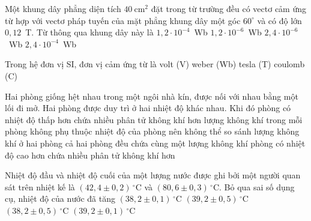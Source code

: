 	\begin{ex}%
		Một khung dây phẳng diện tích $40~\text{cm}^2$ đặt trong từ trường đều có vectơ cảm ứng từ hợp với vectơ pháp tuyến của mặt phẳng khung dây một góc $60^\circ$ và có độ lớn $0{,}12$~T. Từ thông qua khung dây này là
		\choice
		{$1{,}2\cdot 10^{-4}$~Wb}
		{$1{,}2\cdot 10^{-6}$~Wb}
		{$2{,}4\cdot 10^{-6}$~Wb}
		{\True $2{,}4\cdot 10^{-4}$~Wb}
	\end{ex}

	\begin{ex}%
		Trong hệ đơn vị SI, đơn vị cảm ứng từ là
		\choice
		{volt (V)}
		{weber (Wb)}
		{\True tesla (T)}
		{coulomb (C)}
	\end{ex}

	\begin{ex}%
		Hai phòng giống hệt nhau trong một ngôi nhà kín, được nối với nhau bằng một lối đi mở. Hai phòng được duy trì ở hai nhiệt độ khác nhau. Khi đó
		\choice
		{\True phòng có nhiệt độ thấp hơn chứa nhiều phân tử không khí hơn}
		{lượng không khí trong mỗi phòng không phụ thuộc nhiệt độ của phòng nên không thể so sánh lượng không khí ở hai phòng}
		{cả hai phòng đều chứa cùng một lượng không khí}
		{phòng có nhiệt độ cao hơn chứa nhiều phân tử không khí hơn}
	\end{ex}

	\begin{ex}%
		Nhiệt độ đầu và nhiệt độ cuối của một lượng nước được ghi bởi một người quan sát trên nhiệt kế là $(42{,}4\pm 0{,}2)\,^\circ\text{C}$ và $(80{,}6\pm 0{,}3)\,^\circ\text{C}$. Bỏ qua sai số dụng cụ, nhiệt độ của nước đã tăng
		\choice
		{$(38{,}2\pm 0{,}1)\,^\circ\text{C}$}
		{$(39{,}2\pm 0{,}5)\,^\circ\text{C}$}
		{\True $(38{,}2\pm 0{,}5)\,^\circ\text{C}$}
		{$(39{,}2\pm 0{,}1)\,^\circ\text{C}$}
	\end{ex}

